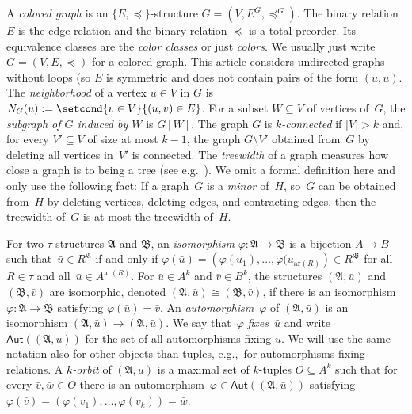 \documentclass[]{lmcs}
\renewcommand{\phi}{\varphi}
\newcommand{\defining}[1]{\emph{#1}}
\newcommand{\iso}{\cong}
\newcommand{\set}[1]{\lbrace #1 \rbrace}
\newcommand{\rel}{R}
\newcommand{\autoA}{\phi}
\newcommand{\autGroup}[1]{\mathsf{Aut}(#1)}
\newcommand{\tup}[1]{\bar{#1}}
\newcommand{\vertA}{u}
\newcommand{\vertB}{v}
\newcommand{\vertC}{w}
\newcommand{\spleq}{\preceq}
\newcommand{\StructA}{\mathfrak{A}}
\newcommand{\StructB}{\mathfrak{B}}
\newcommand{\StructVA}{A}
\newcommand{\StructVB}{B}
\newcommand{\arity}[1]{\mathrm{ar}(#1)}
\newcommand{\sig}{\tau}
\newcommand{\neighbors}[2]{N_{#1}(#2)}
\begin{document}
A \defining{colored graph} is an $\set{E, \spleq}$-structure $G=(V,E^G,\spleq^G)$.
The binary relation $E$ is the edge relation and the binary relation $\spleq$
is a total preorder.
Its equivalence classes are the \defining{color classes} or just \defining{colors}.
We usually just write $G=(V,E,\spleq)$ for a colored graph.
This article considers undirected graphs without loops (so $E$ is symmetric and does not contain pairs of the form $(\vertA,\vertA)$.
The \defining{neighborhood} of a vertex $\vertA \in V$ in $G$ is $\neighbors{G}{\vertA} := \setcond{\vertB \in V}{(\vertA,\vertB) \in E}$.
For a subset $W \subseteq V$ of vertices of~$G$, the \defining{subgraph of $G$ induced by $W$} is $G[W]$.
The graph $G$ is \defining{$k$-connected}
if $|V| > k$ and, for every $V' \subseteq V$ of size at most $k-1$,
the graph $G \setminus V'$ obtained from~$G$ by deleting all vertices in~$V'$ is connected.
The \defining{treewidth} of a graph measures how close a graph is to being a tree (see e.g.~\cite{DawarRicherby07}). We omit a formal definition here and only use the following fact:
If a graph~$G$ is a \defining{minor} of~$H$,
so~$G$ can be obtained from~$H$ by deleting vertices, deleting edges, and contracting edges,
then the treewidth of~$G$ is at most the treewidth of~$H$.

For two $\sig$-structures $\StructA$ and $\StructB$,
an \defining{isomorphism} $\autoA \colon \StructA \to \StructB$
is a bijection $\StructVA \to \StructVB$ 
such that~$\tup{\vertA} \in \rel^\StructA$
if and only if $\autoA(\tup{\vertA})=\left(\autoA(\vertA_1),\dots,\autoA(\vertA_{\arity{\rel}}\right) \in \rel^\StructB$
for all~$\rel \in \sig$ and all~$\tup{\vertA} \in \StructVA^{\arity{\rel}}$.
For $\tup{\vertA}\in \StructVA^k$ and $\tup{\vertB} \in \StructVB^k$,
the structures $(\StructA, \tup{\vertA})$ and $(\StructB, \tup{\vertB})$
are isomorphic, denoted ${(\StructA, \tup{\vertA})\iso (\StructB, \tup{\vertB})}$,
if there is an isomorphism $\autoA\colon\StructA\to\StructB$ satisfying $\autoA(\tup{\vertA}) = \tup{\vertB}$.
An \defining{automorphism}~$\autoA$ of $(\StructA, \tup{\vertA})$ is an isomorphism $(\StructA, \tup{\vertA})\to (\StructA, \tup{\vertA})$.
We say that~$\autoA$ \defining{fixes}~$\tup{\vertA}$
and write $\autGroup{(\StructA, \tup{\vertA})}$
for the set of all automorphisms fixing $\tup{\vertA}$.
We will use the same notation also for other objects than tuples,
e.g.,~for automorphisms fixing relations.
A \defining{$k$-orbit} of $(\StructA, \tup{\vertA})$ is a maximal set of $k$-tuples $O \subseteq \StructVA^k$
such that for every $\tup{\vertB},\tup{\vertC} \in O$
there is an automorphism~$\autoA\in \autGroup{(\StructA, \tup{\vertA})}$
satisfying $\autoA(\tup{\vertB})  = (\autoA(\vertB_1),\dots,\autoA(\vertB_k))= \tup{\vertC}$.
\end{document}
